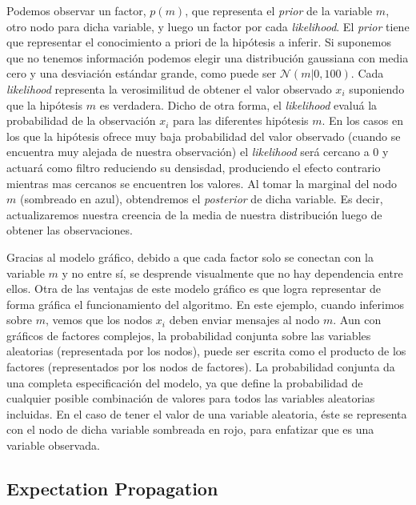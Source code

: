 \documentclass[11pt,twoside,spanish]{report} %
\begin{document}
Podemos observar un factor, $p(m)$, que representa el \textit{prior} de la variable  $m$, otro nodo para dicha variable, y luego un factor por cada \emph{likelihood}.
El \textit{prior} tiene que representar el conocimiento a priori de la hipótesis a inferir.
Si suponemos que no tenemos informaci\'on podemos elegir una distribuci\'on gaussiana con media cero y una desviaci\'on est\'andar grande, como puede ser $\mathcal{N}(m|0,100)$. 
Cada \emph{likelihood} representa la verosimilitud de obtener el valor observado $x_i$ suponiendo que la hipótesis $m$ es verdadera.
Dicho de otra forma, el \emph{likelihood} evalu\'a la probabilidad de la observaci\'on $x_i$ para las diferentes hip\'otesis $m$.
En los casos en los que la hip\'otesis ofrece muy baja probabilidad del valor observado (cuando se encuentra muy alejada de nuestra observaci\'on) el \emph{likelihood} ser\'a cercano a 0 y actuar\'a como filtro reduciendo su densisdad, produciendo el efecto contrario mientras mas cercanos se encuentren los valores.
Al tomar la marginal del nodo $m$ (sombreado en azul), obtendremos el \textit{posterior} de dicha variable.
Es decir, actualizaremos nuestra creencia de la media de nuestra distribuci\'on luego de obtener las observaciones.

Gracias al modelo gr\'afico, debido a que cada factor solo se conectan con la variable $m$ y no entre s\'i, se desprende visualmente que no hay dependencia entre ellos.
Otra de las ventajas de este modelo gr\'afico es que logra representar de forma gr\'afica el funcionamiento del algoritmo.
En este ejemplo, cuando inferimos sobre $m$, vemos que los nodos $x_i$ deben enviar mensajes al nodo $m$.
Aun con gr\'aficos de factores complejos, la probabilidad conjunta sobre las variables aleatorias (representada por los nodos), puede ser escrita como el producto de los factores (representados por los nodos de factores).
La probabilidad conjunta da una completa especificaci\'on del modelo, ya que define la probabilidad de cualquier posible combinaci\'on de valores para todos las variables aleatorias incluidas.
En el caso de tener el valor de una variable aleatoria, \'este se representa con el nodo de dicha variable sombreada en rojo, para enfatizar que es una variable observada.


\subsection{Expectation Propagation}
\end{document}
